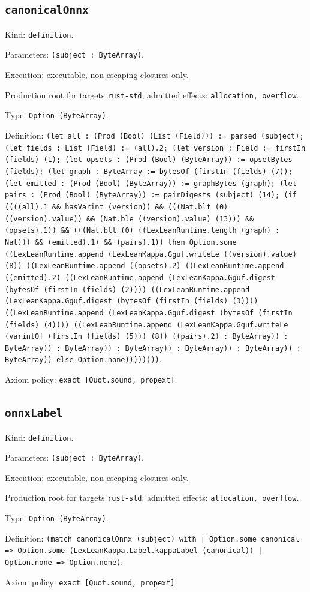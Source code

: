 \documentclass[11pt]{article}
\begin{document}
\subsection*{\texttt{canonicalOnnx}}
\noindent Kind: \texttt{definition}.\par
\noindent Parameters: \texttt{(subject : ByteArray)}.\par
\noindent Execution: executable, non-escaping closures only.\par
\noindent Production root for targets \texttt{rust-std}; admitted effects: \texttt{allocation, overflow}.\par
\noindent Type: \texttt{Option (ByteArray)}.\par
\noindent Definition: \texttt{(let all : (Prod (Bool) (List (Field))) := parsed (subject); (let fields : List (Field) := (all).2; (let version : Field := firstIn (fields) (1); (let opsets : (Prod (Bool) (ByteArray)) := opsetBytes (fields); (let graph : ByteArray := bytesOf (firstIn (fields) (7)); (let emitted : (Prod (Bool) (ByteArray)) := graphBytes (graph); (let pairs : (Prod (Bool) (ByteArray)) := pairDigests (subject) (14); (if ((((all).1 \&\& hasVarint (version)) \&\& (((Nat.blt (0) ((version).value)) \&\& (Nat.ble ((version).value) (13))) \&\& (opsets).1)) \&\& (((Nat.blt (0) ((LexLeanRuntime.length (graph) : Nat))) \&\& (emitted).1) \&\& (pairs).1)) then Option.some ((LexLeanRuntime.append (LexLeanKappa.Gguf.writeLe ((version).value) (8)) ((LexLeanRuntime.append ((opsets).2) ((LexLeanRuntime.append ((emitted).2) ((LexLeanRuntime.append (LexLeanKappa.Gguf.digest (bytesOf (firstIn (fields) (2)))) ((LexLeanRuntime.append (LexLeanKappa.Gguf.digest (bytesOf (firstIn (fields) (3)))) ((LexLeanRuntime.append (LexLeanKappa.Gguf.digest (bytesOf (firstIn (fields) (4)))) ((LexLeanRuntime.append (LexLeanKappa.Gguf.writeLe (varintOf (firstIn (fields) (5))) (8)) ((pairs).2) : ByteArray)) : ByteArray)) : ByteArray)) : ByteArray)) : ByteArray)) : ByteArray)) : ByteArray)) else Option.none))))))))}.\par
\noindent Axiom policy: \texttt{exact [Quot.sound, propext]}.\par
\subsection*{\texttt{onnxLabel}}
\noindent Kind: \texttt{definition}.\par
\noindent Parameters: \texttt{(subject : ByteArray)}.\par
\noindent Execution: executable, non-escaping closures only.\par
\noindent Production root for targets \texttt{rust-std}; admitted effects: \texttt{allocation, overflow}.\par
\noindent Type: \texttt{Option (ByteArray)}.\par
\noindent Definition: \texttt{(match canonicalOnnx (subject) with | Option.some canonical => Option.some (LexLeanKappa.Label.kappaLabel (canonical)) | Option.none => Option.none)}.\par
\noindent Axiom policy: \texttt{exact [Quot.sound, propext]}.\par
\end{document}
